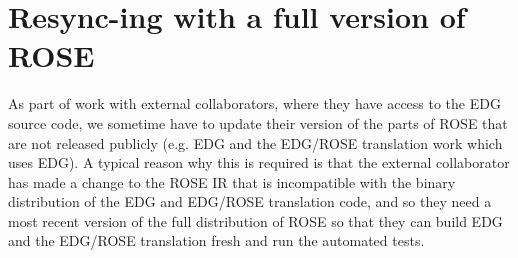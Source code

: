 \section{Resync-ing with a full version of ROSE}%
   As part of work with external collaborators, where they have 
access to the EDG source code, we sometime have to update their
version of the parts of ROSE that are not released publicly
(e.g. EDG and the EDG/ROSE translation work which uses EDG).
A typical reason why this is required is that the external
collaborator has made a change to the ROSE IR that is incompatible
with the binary distribution of the EDG and EDG/ROSE translation code,
and so they need a most recent version of the full distribution of
ROSE so that they can build EDG and the EDG/ROSE translation fresh
and run the automated tests.


